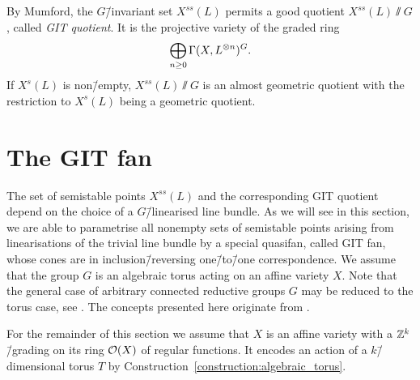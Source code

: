 \begin{remark}
	\label{remark:semistable_points_yield_git_quotient}
	By Mumford, the $G$\=/invariant set $X^{ss}(L)$ permits a good quotient $X^{ss}(L)\sslash G$, called \emph{GIT quotient}. It is the projective variety of the graded ring
	$$\bigoplus_{n\geq 0} \Gamma(X,L^{\otimes n})^G.$$
	If  $X^{s}(L)$ is non\=/empty, $X^{ss}(L)\sslash G$ is an almost geometric quotient with the restriction to $X^{s}(L)$ being a geometric quotient.
\end{remark}

\section{The GIT fan}
\label{sec:git_fan}

The set of semistable points $X^{ss}(L)$ and the corresponding GIT quotient depend on the choice of a $G$\=/linearised line bundle. As we will see in this section, we are able to parametrise all nonempty sets of semistable points arising from linearisations of the trivial line bundle by a special quasifan, called GIT fan, whose cones are in inclusion\=/reversing one\=/to\=/one correspondence. We assume that the group $G$ is an algebraic torus acting on an affine variety $X$. Note that the general case of arbitrary connected reductive groups $G$ may be reduced to the torus case, see \cite[Lemma 3.3]{git_via_cox_rings}. The concepts presented here originate from \cite[chapter 2]{git_equivalence}.

For the remainder of this section we assume that $X$ is an affine variety with a $\mathbb{Z}^k$\=/grading on its ring $\mathcal{O}(X)$ of regular functions. It encodes an action of a $k$\=/dimensional torus $T$ by Construction~\ref{construction:algebraic_torus}.

